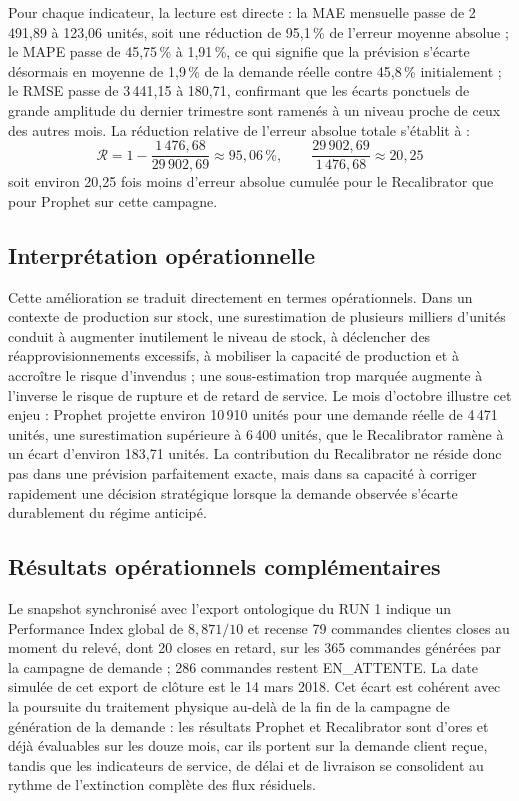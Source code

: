 \documentclass[11pt,a4paper]{article}
\begin{document}
Pour chaque indicateur, la lecture est directe : la MAE mensuelle passe de 2\,491,89 à 123,06 unités, soit une réduction de 95,1\,\% de l'erreur moyenne absolue ; le MAPE passe de 45,75\,\% à 1,91\,\%, ce qui signifie que la prévision s'écarte désormais en moyenne de 1,9\,\% de la demande réelle contre 45,8\,\% initialement ; le RMSE passe de 3\,441,15 à 180,71, confirmant que les écarts ponctuels de grande amplitude du dernier trimestre sont ramenés à un niveau proche de ceux des autres mois. La réduction relative de l'erreur absolue totale s'établit à :
\[
\mathcal{R} = 1 - \frac{1\,476{,}68}{29\,902{,}69} \approx 95{,}06\,\%, \qquad
\frac{29\,902{,}69}{1\,476{,}68} \approx 20{,}25
\]
soit environ 20,25 fois moins d'erreur absolue cumulée pour le Recalibrator que pour Prophet sur cette campagne.

\subsection{Interprétation opérationnelle}

Cette amélioration se traduit directement en termes opérationnels. Dans un contexte de production sur stock, une surestimation de plusieurs milliers d'unités conduit à augmenter inutilement le niveau de stock, à déclencher des réapprovisionnements excessifs, à mobiliser la capacité de production et à accroître le risque d'invendus ; une sous-estimation trop marquée augmente à l'inverse le risque de rupture et de retard de service. Le mois d'octobre illustre cet enjeu : Prophet projette environ 10\,910 unités pour une demande réelle de 4\,471 unités, une surestimation supérieure à 6\,400 unités, que le Recalibrator ramène à un écart d'environ 183,71 unités. La contribution du Recalibrator ne réside donc pas dans une prévision parfaitement exacte, mais dans sa capacité à corriger rapidement une décision stratégique lorsque la demande observée s'écarte durablement du régime anticipé.

\subsection{Résultats opérationnels complémentaires}

Le snapshot synchronisé avec l'export ontologique du RUN 1 indique un Performance Index global de \(8{,}871/10\) et recense 79 commandes clientes closes au moment du relevé, dont 20 closes en retard, sur les 365 commandes générées par la campagne de demande ; 286 commandes restent EN\_ATTENTE. La date simulée de cet export de clôture est le 14 mars 2018. Cet écart est cohérent avec la poursuite du traitement physique au-delà de la fin de la campagne de génération de la demande : les résultats Prophet et Recalibrator sont d'ores et déjà évaluables sur les douze mois, car ils portent sur la demande client reçue, tandis que les indicateurs de service, de délai et de livraison se consolident au rythme de l'extinction complète des flux résiduels.
\end{document}

